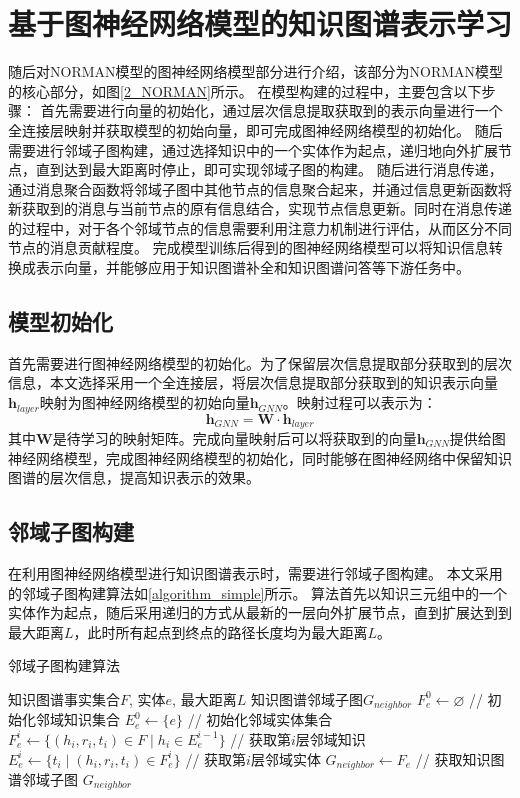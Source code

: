 \documentclass[algorithmlist, AutoFakeBold, AutoFakeSlant, figurelist, tablelist, nomlist, engineering]{seuthesix}
\begin{document}
\section{基于图神经网络模型的知识图谱表示学习}
随后对NORMAN模型的图神经网络模型部分进行介绍，该部分为NORMAN模型的核心部分，如图\ref{2_NORMAN}所示。
在模型构建的过程中，主要包含以下步骤：
首先需要进行向量的初始化，通过层次信息提取获取到的表示向量进行一个全连接层映射并获取模型的初始向量，即可完成图神经网络模型的初始化。
随后需要进行邻域子图构建，通过选择知识中的一个实体作为起点，递归地向外扩展节点，直到达到最大距离时停止，即可实现邻域子图的构建。
随后进行消息传递，通过消息聚合函数将邻域子图中其他节点的信息聚合起来，并通过信息更新函数将新获取到的消息与当前节点的原有信息结合，实现节点信息更新。同时在消息传递的过程中，对于各个邻域节点的信息需要利用注意力机制进行评估，从而区分不同节点的消息贡献程度。
完成模型训练后得到的图神经网络模型可以将知识信息转换成表示向量，并能够应用于知识图谱补全和知识图谱问答等下游任务中。

\subsection{模型初始化}
首先需要进行图神经网络模型的初始化。为了保留层次信息提取部分获取到的层次信息，本文选择采用一个全连接层，将层次信息提取部分获取到的知识表示向量$\bm{h}_{layer}$映射为图神经网络模型的初始向量$\bm{h}_{GNN}$。映射过程可以表示为：
\begin{equation}
  \bm{h}_{GNN} = \mathbf{W} \cdot \bm{h}_{layer}
\end{equation}
其中$\mathbf{W}$是待学习的映射矩阵。完成向量映射后可以将获取到的向量$\bm{h}_{GNN}$提供给图神经网络模型，完成图神经网络模型的初始化，同时能够在图神经网络中保留知识图谱的层次信息，提高知识表示的效果。

\subsection{邻域子图构建}
在利用图神经网络模型进行知识图谱表示时，需要进行邻域子图构建。
本文采用的邻域子图构建算法如\ref{algorithm_simple}所示。
算法首先以知识三元组中的一个实体作为起点，随后采用递归的方式从最新的一层向外扩展节点，直到扩展达到到最大距离$L$，此时所有起点到终点的路径长度均为最大距离$L$。
\begin{algorithm}[tb]
	\caption{邻域子图构建算法}
	\label{algorithm_simple}
	\begin{algorithmic}[1]
  \Require 知识图谱事实集合$F$, 实体$e$, 最大距离$L$
  \Ensure 知识图谱邻域子图$G_{neighbor}$
  \State $F_{e}^{0} \leftarrow \varnothing$ // 初始化邻域知识集合
  \State $E_{e}^{0} \leftarrow \{e\}$ // 初始化邻域实体集合
  \State $F_{e}^{i} \leftarrow \{(h_i, r_i, t_i) \in F \mid h_i \in E_{e}^{i-1}\}$ // 获取第$i$层邻域知识
  \State $E_{e}^{i} \leftarrow \{t_i \mid (h_i, r_i, t_i) \in F_{e}^{i}\}$ // 获取第$i$层邻域实体
  \EndFor
  \State $G_{neighbor} \leftarrow F_{e}$ // 获取知识图谱邻域子图
  \State \Return $G_{neighbor}$
	\end{algorithmic}
\end{algorithm} 
\end{document}

